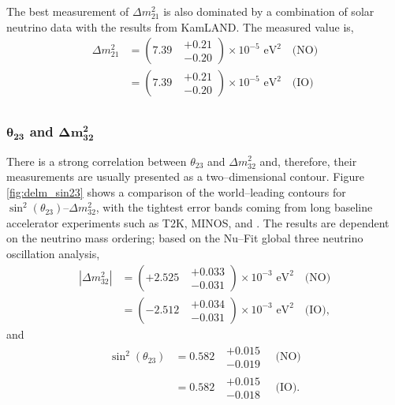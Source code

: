The best measurement of $\Delta m^2_{21}$ is also dominated by a combination of
solar neutrino data with the results from KamLAND. The measured value is,
\begin{align*}
	\Delta m^2_{21} &= (7.39 \mbox{ } \substack{+ 0.21 \\ - 0.20}) \times 10^{-5} \mbox{  eV}^2 \quad \mbox{(NO)} \\
	                &= (7.39 \mbox{ } \substack{+ 0.21 \\ - 0.20}) \times 10^{-5} \mbox{  eV}^2 \quad \mbox{(IO)} \\
\end{align*}

\subsubsection*{$\boldsymbol{\theta_{23}}$ and $\boldsymbol{\Delta m^2_{32}}$}

There is a strong correlation between $\theta_{23}$ and $\Delta m^2_{32}$ and,
therefore, their measurements are usually presented as a two--dimensional
contour. Figure \ref{fig:delm_sin23} shows a comparison of the world--leading
contours for $\sin^2 (\theta_{23})$--$\Delta m^2_{32}$, with the tightest error
bands coming from long baseline accelerator experiments such as T2K, MINOS, and 
\nova{}\cite{PhysRevD.96.092006, PhysRevLett.112.191801, PhysRevLett.123.151803}. 
The results are dependent on the neutrino mass ordering; based on the Nu--Fit 
global three neutrino oscillation analysis\cite{Esteban:2018azc}, 
\begin{align*}
	|\Delta m^2_{32}| &= (+ 2.525 \mbox{ } \substack{+ 0.033 \\ - 0.031}) \times 10^{-3} \mbox{  eV}^2 \quad \mbox{(NO)} \\
	                  &= (- 2.512 \mbox{ } \substack{+ 0.034 \\ - 0.031}) \times 10^{-3} \mbox{  eV}^2 \quad \mbox{(IO)},
\end{align*}
and 
\begin{align*}
	\sin^2(\theta_{23}) &= 0.582 \mbox{  } \substack{+ 0.015 \\ - 0.019} \quad \mbox{(NO)} \nonumber \\
	                    &= 0.582 \mbox{  } \substack{+ 0.015 \\ - 0.018} \quad \mbox{(IO)}.
\end{align*}

